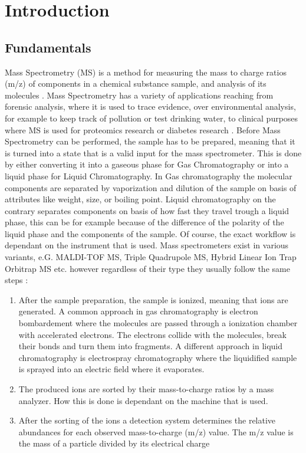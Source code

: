 \documentclass[11pt]{article}
\begin{document}
\tableofcontents
\newpage

\newpage\null\thispagestyle{empty}\newpage

\section{Introduction}
\subsection{Fundamentals}
Mass Spectrometry (MS) is a method for measuring the mass to charge ratios (m/z) of components in a chemical substance sample, and analysis of its molecules \cite{mass-specrometer}. Mass Spectrometry has a variety of applications \cite{ms-applications} reaching from forensic analysis, where it is used to trace evidence, over environmental analysis, for example to keep track of pollution or test drinking water, to clinical purposes where MS is used for proteomics research or diabetes research \cite{ms-diabetes}.
Before Mass Spectrometry can be performed, the sample has to be prepared, meaning that it is turned into a state that is a valid input for the mass spectrometer. This is done by either converting it into a gaseous phase for Gas Chromatography or into a liquid phase for Liquid Chromatography. In Gas chromatography the molecular components are separated by vaporization and dilution of the sample on basis of attributes like weight, size, or boiling point. Liquid chromatography on the contrary separates components on basis of how fast they travel trough a liquid phase, this can be for example because of the difference of the polarity of the liquid phase and the components of the sample. Of course, the exact workflow is dependant on the instrument that is used. Mass spectrometers exist in various variants, e.G. MALDI-TOF MS, Triple Quadrupole MS, Hybrid Linear Ion Trap Orbitrap MS etc.  \cite{mass-specrometer-types} however regardless of their type they usually follow the same steps \cite{mass-specrometer, what-is-mass-spectrometry}:

\begin{enumerate}
\item After the sample preparation, the sample is ionized, meaning that ions are generated. A common approach in gas chromatography is electron bombardement where the molecules are passed through a ionization chamber with accelerated electrons. The electrons collide with the molecules, break their bonds and turn them into fragments. A different approach in liquid
chromatography is electrospray chromatography where the liquidified sample is sprayed into an electric field where it evaporates.
\item The produced ions are sorted by their mass-to-charge ratios by a mass analyzer. How this is done is dependant on the machine that is used.
\item After the sorting of the ions a detection system determines the relative abundances for each observed mass-to-charge (m/z) value. The m/z value is the mass of a particle divided by its electrical charge
\end{enumerate} 
\end{document}
